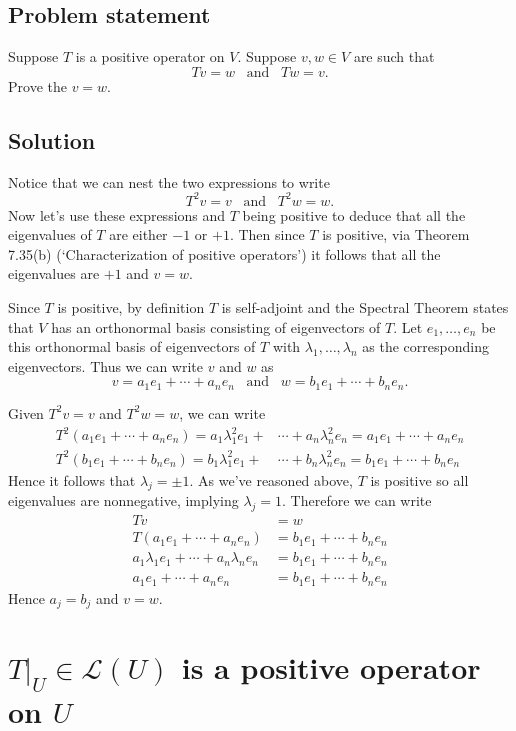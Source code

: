 \documentclass{article}
\begin{document}
\subsection*{Problem statement}
Suppose $T$ is a positive operator on $V$. Suppose $v,w\in V$ are such that 
\[Tv=w\;\;\;\text{and}\;\;\;Tw=v.\]
Prove the $v=w$.

\subsection*{Solution}
Notice that we can nest the two expressions to write
\[T^2v=v\;\;\;\text{and}\;\;\;T^2w=w.\]
Now let's use these expressions and $T$ being positive to deduce that all the eigenvalues of $T$ are either $-1$ or $+1$. Then since $T$ is positive, via Theorem 7.35(b) (`Characterization of positive operators') it follows that all the eigenvalues are $+1$ and $v=w$.

Since $T$ is positive, by definition $T$ is self-adjoint and the Spectral Theorem states that $V$ has an orthonormal basis consisting of eigenvectors of $T$. Let $e_1,\ldots,e_n$ be this orthonormal basis of eigenvectors of $T$ with $\lambda_1,\ldots,\lambda_n$ as the corresponding eigenvectors. Thus we can write $v$ and $w$ as
\[v=a_1e_1+\cdots+a_ne_n\;\;\;\text{and}\;\;\;w=b_1e_1+\cdots+b_ne_n.\]

Given $T^2v=v$ and $T^2w=w$, we can write
\begin{align*}
    T^2(a_1e_1+\cdots+a_ne_n)=a_1\lambda_1^2e_1+&\cdots+a_n\lambda_n^2e_n=a_1e_1+\cdots+a_ne_n\\
    T^2(b_1e_1+\cdots+b_ne_n)=b_1\lambda_1^2e_1+&\cdots+b_n\lambda_n^2e_n=b_1e_1+\cdots+b_ne_n
\end{align*}
Hence it follows that $\lambda_j=\pm 1$. As we've reasoned above, $T$ is positive so all eigenvalues are nonnegative, implying $\lambda_j=1$. Therefore we can write
\begin{align*}
    Tv&=w \\
    T(a_1e_1+\cdots+a_ne_n)&=b_1e_1+\cdots+b_ne_n \\
    a_1\lambda_1e_1+\cdots+a_n\lambda_ne_n&=b_1e_1+\cdots+b_ne_n \\
    a_1e_1+\cdots+a_ne_n&=b_1e_1+\cdots+b_ne_n
\end{align*}
Hence $a_j=b_j$ and $v=w$.

\clearpage

\section{$T|_U\in\mathcal{L}(U)$ is a positive operator on $U$}
\end{document}

